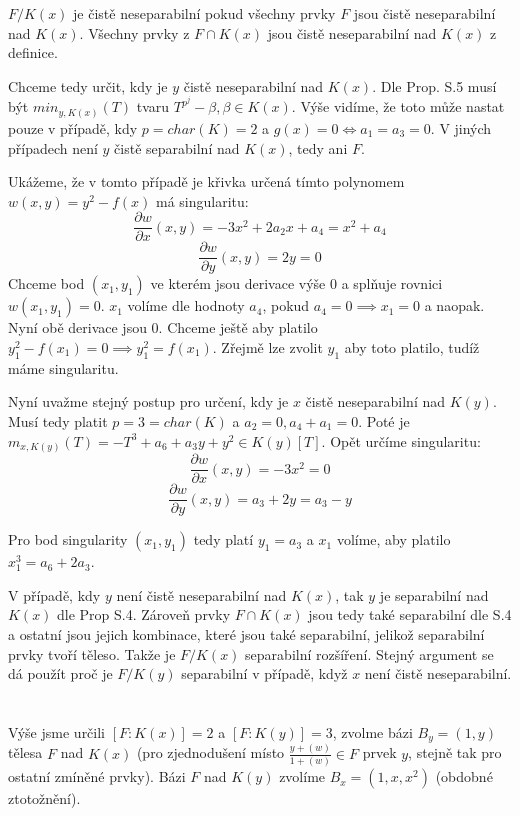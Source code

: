 \documentclass[12pt, a4paper]{article}
\begin{document}
$F/K(x)$ je čistě neseparabilní pokud všechny prvky $F$ jsou čistě neseparabilní nad $K(x)$. Všechny prvky  z $F \cap K(x)$ jsou čistě neseparabilní nad $K(x)$ z definice. 

Chceme tedy určit, kdy je $y$ čistě neseparabilní nad $K(x)$. Dle Prop. S.5 musí být $min_{y,K(x)}(T)$ tvaru $T^{p^j}-\beta, \beta \in K(x)$. Výše vidíme, že toto může nastat pouze v případě, kdy $p = char(K) = 2$ a $g(x)=0 \iff a_1=a_3=0$. V jiných případech není $y$ čistě separabilní nad $K(x)$, tedy ani $F$.

Ukážeme, že v tomto případě je křivka určená tímto polynomem $w(x,y)= y^2 - f(x)$ má singularitu:
\[ 
\frac{\partial w}{\partial x}(x,y) = -3x^2+2a_2x+a_4 = x^2+a_4
\]
\[
\frac{\partial w}{\partial y}(x,y) = 2y = 0
\]
Chceme bod $(x_1,y_1)$ ve kterém jsou derivace výše $0$ a splňuje rovnici $w(x_1,y_1)=0$. $x_1$ volíme dle hodnoty $a_4$, pokud $a_4 = 0 \implies x_1 = 0$ a naopak. Nyní obě derivace jsou 0. Chceme ještě aby platilo $y_1^2-f(x_1) = 0 \implies y_1^2 = f(x_1)$. Zřejmě lze zvolit $y_1$ aby toto platilo, tudíž máme singularitu.

Nyní uvažme stejný postup pro určení, kdy je $x$ čistě neseparabilní nad $K(y)$. Musí tedy platit $p=3=char(K)$ a $a_2=0, a_4+a_1 = 0$. Poté je $m_{x,K(y)}(T)=-T^3+a_6 + a_3y + y^2 \in K(y)[T]$.
Opět určíme singularitu:
\[ 
\frac{\partial w}{\partial x}(x,y) = -3x^2 = 0
\]
\[
\frac{\partial w}{\partial y}(x,y) = a_3+2y = a_3 - y
\]

Pro bod singularity $(x_1,y_1)$ tedy platí $y_1 = a_3$ a $x_1$ volíme, aby platilo $x_1^3=a_6+2a_3$.

V případě, kdy $y$ není čistě neseparabilní nad $K(x)$, tak $y$ je separabilní nad $K(x)$ dle Prop S.4. Zároveň prvky $F \cap K(x)$ jsou tedy také separabilní dle S.4 a ostatní jsou jejich kombinace, které jsou také separabilní, jelikož separabilní prvky tvoří těleso. Takže je $F/K(x)$ separabilní rozšíření. Stejný argument se dá použít proč je $F/K(y)$ separabilní v případě, když $x$ není čistě neseparabilní.

\section{}
Výše jsme určili $[F:K(x)]=2$ a $[F:K(y)] = 3$, zvolme bázi $B_y = (1,y)$ tělesa $F$ nad $K(x)$ (pro zjednodušení místo $\frac{y+(w)}{1+(w)} \in F$ prvek $y$, stejně tak pro ostatní zmíněné prvky). Bázi $F$ nad $K(y)$ zvolíme $B_x=(1,x,x^2)$ (obdobné ztotožnění).
\end{document}
